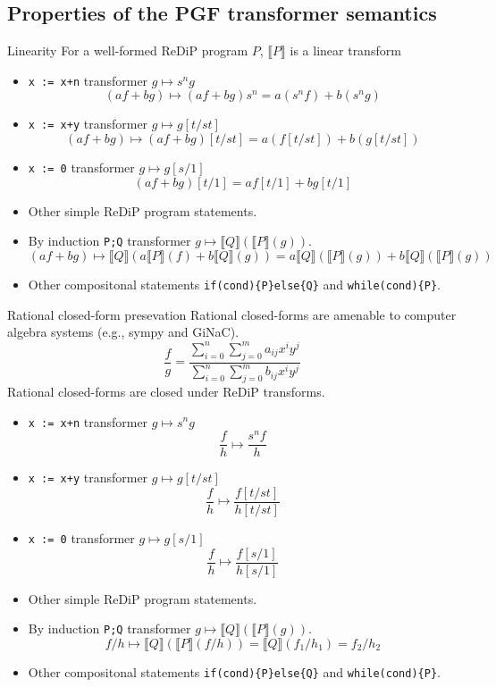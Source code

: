 \documentclass[8pt]{beamer}
\renewcommand{\S}[1]{ \llbracket #1 \rrbracket }
\begin{document}
\subsection{Properties of the PGF transformer semantics}
\begin{frame}{Linearity}
	For a well-formed ReDiP program \(P\), \(\S{P}\) is a linear transform
	\begin{itemize}
		\item \texttt{x := x+n} transformer \(g\mapsto s^n g\)
		      \[
			      (af + bg) \mapsto (af + bg)s^n = a(s^n f) + b(s^n g)
		      \]
		\item \texttt{x := x+y} transformer \(g\mapsto g[t/st]\)
		      \[
			      (af + bg) \mapsto (af + bg)[t/st] = a(f[t/st]) + b(g[t/st])
		      \]
		\item \texttt{x := 0} transformer \(g\mapsto g[s/1]\)
		      \[
			      (af + bg)[t/1] = af[t/1] + bg[t/1]
		      \]
		\item Other simple ReDiP program statements.
		\item By induction \texttt{P;Q} transformer \(g\mapsto \S{Q}(\S{P}(g))\).
		      \[
			      (af+bg) \mapsto \S{Q}(a\S{P}(f) + b\S{Q}(g)) = a\S{Q}(\S{P}(g)) + b \S{Q}(\S{P}(g))
		      \]
		\item Other compositonal statements \texttt{if(cond)\{P\}else\{Q\}} and \texttt{while(cond)\{P\}}.
	\end{itemize}
\end{frame}
\begin{frame}{Rational closed-form presevation}
	Rational closed-forms are amenable to computer algebra systems (e.g., sympy and GiNaC).
	\[
		\frac{f}{g} = \dfrac
		{ \sum_{i=0}^n\sum_{j=0}^m a_{ij} x^iy^j }
		{ \sum_{i=0}^n\sum_{j=0}^m b_{ij} x^iy^j }
	\]
	Rational closed-forms are closed under ReDiP transforms.
	\begin{itemize}
		\item \texttt{x := x+n} transformer \(g\mapsto s^n g\)
		      \[
			      \frac{f}{h} \mapsto \frac{s^n f}{h}
		      \]
		\item \texttt{x := x+y} transformer \(g\mapsto g[t/st]\)
		      \[
			      \frac{f}{h} \mapsto \frac{f[t/st]}{h[t/st]}
		      \]
		\item \texttt{x := 0} transformer \(g\mapsto g[s/1]\)
		      \[
			      \frac{f}{h} \mapsto \frac{f[s/1]}{h[s/1]}
		      \]
		\item Other simple ReDiP program statements.
		\item By induction \texttt{P;Q} transformer \(g\mapsto \S{Q}(\S{P}(g))\).
		      \[
			      f/h \mapsto \S{Q}(\S{P}(f/h)) = \S{Q}(f_1/h_1) = f_2/h_2
		      \]
		\item Other compositonal statements \texttt{if(cond)\{P\}else\{Q\}} and \texttt{while(cond)\{P\}}.
	\end{itemize}
\end{frame}
\end{document}
